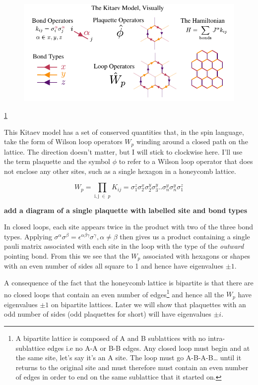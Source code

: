 \begin{figure}
\hypertarget{fig:vis_kitaev_1}{%
\centering
\includegraphics{figure_code/amk_chapter/visual_kitaev_1.pdf}
\caption{}\label{fig:vis_kitaev_1}
}
\end{figure}

\ref{fig:vis_kitaev_1}

This Kitaev model has a set of conserved quantities that, in the spin
language, take the form of Wilson loop operators \(W_p\) winding around
a closed path on the lattice. The direction doesn't matter, but I will
stick to clockwise here. I'll use the term plaquette and the symbol
\(\phi\) to refer to a Wilson loop operator that does not enclose any
other sites, such as a single hexagon in a honeycomb lattice.

\[W_p = \prod_{\mathrm{i,j}\; \in\; p} K_{ij} = \sigma_1^z \sigma_2^x \sigma_2^y \sigma_3^y .. \sigma_n^y \sigma_n^y \sigma_1^z\]

\textbf{add a diagram of a single plaquette with labelled site and bond
types}

In closed loops, each site appears twice in the product with two of the
three bond types. Applying
\(\sigma^\alpha \sigma^\beta = \epsilon^{\alpha \beta \gamma} \sigma^\gamma, \alpha \neq \beta\)
then gives us a product containing a single pauli matrix associated with
each site in the loop with the type of the \emph{outward} pointing bond.
From this we see that the \(W_p\) associated with hexagons or shapes
with an even number of sides all square to 1 and hence have eigenvalues
\(\pm 1\).

A consequence of the fact that the honeycomb lattice is bipartite is
that there are no closed loops that contain an even number of
edges\footnote{A bipartite lattice is composed of A and B sublattices
  with no intra-sublattice edges i.e no A-A or B-B edges. Any closed
  loop must begin and at the same site, let's say it's an A site. The
  loop must go A-B-A-B\ldots{} until it returns to the original site and
  must therefore must contain an even number of edges in order to end on
  the same sublattice that it started on.} and hence all the \(W_p\)
have eigenvalues \(\pm 1\) on bipartite lattices. Later we will show
that plaquettes with an odd number of sides (odd plaquettes for short)
will have eigenvalues \(\pm i\).

